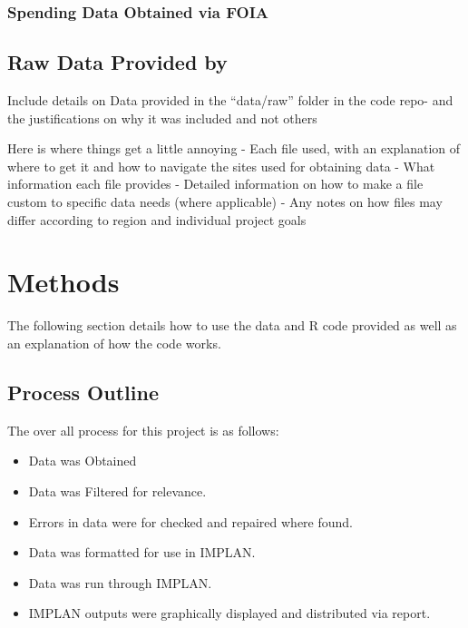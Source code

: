 \documentclass[
]{book}
\providecommand{\tightlist}{%
  \setlength{\itemsep}{0pt}\setlength{\parskip}{0pt}}
\begin{document}
\hypertarget{spending-data-obtained-via-foia}{%
\subsection{Spending Data Obtained via FOIA}\label{spending-data-obtained-via-foia}}

\hypertarget{raw-data-provided-by}{%
\section{Raw Data Provided by}\label{raw-data-provided-by}}

Include details on Data provided in the ``data/raw'' folder in the code repo- and the justifications on why it was included and not others

Here is where things get a little annoying
- Each file used, with an explanation of where
to get it and how to navigate the sites used for obtaining data
- What information each file provides
- Detailed information on how to make a file custom to specific data needs (where applicable)
- Any notes on how files may differ according to region and individual project goals

\hypertarget{methods}{%
\chapter{Methods}\label{methods}}

The following section details how to use the data and R code provided as well as an explanation of how the code works.

\hypertarget{process-outline}{%
\section{Process Outline}\label{process-outline}}

The over all process for this project is as follows:

\begin{itemize}
\tightlist
\item
  Data was Obtained
\item
  Data was Filtered for relevance.
\item
  Errors in data were for checked and repaired where found.
\item
  Data was formatted for use in IMPLAN.
\item
  Data was run through IMPLAN.
\item
  IMPLAN outputs were graphically displayed and distributed via report.
\end{itemize}
\end{document}
